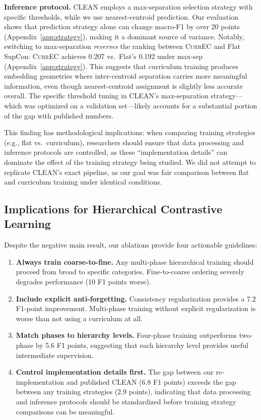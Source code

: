 \documentclass{article}
\newcommand{\currec}{\textsc{CurrEC}}
\begin{document}
\textbf{Inference protocol.} CLEAN employs a max-separation selection strategy with specific thresholds, while we use nearest-centroid prediction. Our evaluation shows that prediction strategy alone can change macro-F1 by over 20 points (Appendix~\ref{app:strategy}), making it a dominant source of variance. Notably, switching to max-separation \emph{reverses} the ranking between \currec{} and Flat SupCon: \currec{} achieves 0.207 vs.\ Flat's 0.192 under max-sep (Appendix~\ref{app:strategy}). This suggests that curriculum training produces embedding geometries where inter-centroid separation carries more meaningful information, even though nearest-centroid assignment is slightly less accurate overall. The specific threshold tuning in CLEAN's max-separation strategy---which was optimized on a validation set---likely accounts for a substantial portion of the gap with published numbers.

This finding has methodological implications: when comparing training strategies (e.g., flat vs.\ curriculum), researchers should ensure that data processing and inference protocols are controlled, as these ``implementation details'' can dominate the effect of the training strategy being studied. We did not attempt to replicate CLEAN's exact pipeline, as our goal was fair comparison between flat and curriculum training under identical conditions.

\subsection{Implications for Hierarchical Contrastive Learning}

Despite the negative main result, our ablations provide four actionable guidelines:

\begin{enumerate}
    \item \textbf{Always train coarse-to-fine.} Any multi-phase hierarchical training should proceed from broad to specific categories. Fine-to-coarse ordering severely degrades performance (10 F1 points worse).
    \item \textbf{Include explicit anti-forgetting.} Consistency regularization provides a 7.2 F1-point improvement. Multi-phase training without explicit regularization is worse than not using a curriculum at all.
    \item \textbf{Match phases to hierarchy levels.} Four-phase training outperforms two-phase by 5.6 F1 points, suggesting that each hierarchy level provides useful intermediate supervision.
    \item \textbf{Control implementation details first.} The gap between our re-implementation and published CLEAN (6.8 F1 points) exceeds the gap between any training strategies (2.9 points), indicating that data processing and inference protocols should be standardized before training strategy comparisons can be meaningful.
\end{enumerate}
\end{document}
